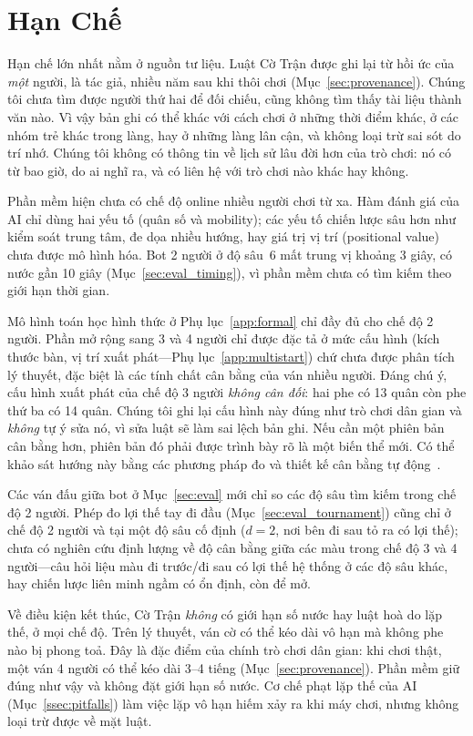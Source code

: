 \section{Hạn Chế}
\label{sec:limitations}

Hạn chế lớn nhất nằm ở nguồn tư liệu. Luật Cờ Trận được ghi lại từ hồi ức
của \emph{một} người, là tác giả, nhiều năm sau khi thôi chơi
(Mục~\ref{sec:provenance}). Chúng tôi chưa tìm được người thứ hai để đối
chiếu, cũng không tìm thấy tài liệu thành văn nào. Vì vậy bản ghi có thể
khác với cách chơi ở những thời điểm khác, ở các nhóm trẻ khác trong làng,
hay ở những làng lân cận, và không loại trừ sai sót do trí nhớ. Chúng tôi
không có thông tin về lịch sử lâu đời hơn của trò chơi: nó có từ bao giờ,
do ai nghĩ ra, và có liên hệ với trò chơi nào khác hay không.

Phần mềm hiện chưa có chế độ online nhiều người chơi từ xa. Hàm đánh
giá của AI chỉ dùng hai yếu tố (quân số và mobility); các yếu tố chiến
lược sâu hơn như kiểm soát trung tâm, đe dọa nhiều hướng, hay giá trị
vị trí (positional value) chưa được mô hình hóa. Bot 2 người ở độ sâu~6
mất trung vị khoảng 3 giây, có nước gần 10 giây (Mục~\ref{sec:eval_timing}),
vì phần mềm chưa có tìm kiếm theo giới hạn thời gian.

Mô hình toán học hình thức ở Phụ lục~\ref{app:formal} chỉ đầy đủ cho chế
độ 2 người. Phần mở rộng sang 3 và 4 người chỉ được đặc tả ở mức cấu hình
(kích thước bàn, vị trí xuất phát---Phụ lục~\ref{app:multistart}) chứ chưa
được phân tích lý thuyết, đặc biệt là các tính chất cân bằng của ván nhiều
người. Đáng chú ý, cấu hình xuất phát của chế độ 3 người \emph{không cân
đối}: hai phe có 13 quân còn phe thứ ba có 14 quân. Chúng tôi ghi lại cấu
hình này đúng như trò chơi dân gian và \emph{không} tự ý sửa nó, vì sửa luật
sẽ làm sai lệch bản ghi. Nếu cần một phiên bản cân bằng hơn, phiên bản đó
phải được trình bày rõ là một biến thể mới. Có thể khảo sát hướng này bằng
các phương pháp đo và thiết kế cân bằng tự động~\citep{hommarks2007balanced}.

Các ván đấu giữa bot ở Mục~\ref{sec:eval} mới chỉ so các độ sâu tìm kiếm
trong chế độ 2 người. Phép đo lợi thế tay đi đầu
(Mục~\ref{sec:eval_tournament}) cũng chỉ ở chế độ 2 người và tại một độ
sâu cố định ($d{=}2$, nơi bên đi sau tỏ ra có lợi thế); chưa có nghiên cứu
định lượng về độ cân bằng giữa các màu trong chế độ 3 và 4 người---câu hỏi
liệu màu đi trước/đi sau có lợi thế hệ thống ở các độ sâu khác, hay chiến
lược liên minh ngầm có ổn định, còn để mở.

Về điều kiện kết thúc, Cờ Trận \emph{không} có giới hạn số nước hay luật
hoà do lặp thế, ở mọi chế độ. Trên lý thuyết, ván cờ có thể kéo dài vô hạn
mà không phe nào bị phong toả. Đây là đặc điểm của chính trò chơi dân gian:
khi chơi thật, một ván 4 người có thể kéo dài 3--4 tiếng
(Mục~\ref{sec:provenance}). Phần mềm giữ đúng như vậy và không đặt giới hạn
số nước. Cơ chế phạt lặp thế của AI (Mục~\ref{ssec:pitfalls}) làm việc lặp
vô hạn hiếm xảy ra khi máy chơi, nhưng không loại trừ được về mặt luật.
